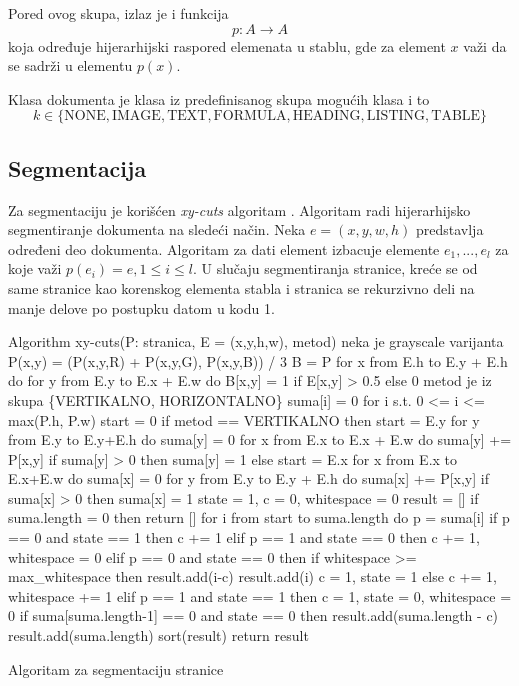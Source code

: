 \documentclass[]{amsart}
\begin{document}
Pored ovog skupa, izlaz je i funkcija $$ p : A \to A $$ koja određuje hijerarhijski raspored elemenata u stablu, gde za element $ x $ važi da se
sadrži u elementu $ p(x) $. 

Klasa dokumenta je klasa iz predefinisanog skupa mogućih klasa i to $$ k \in \{\text{NONE}, \text{IMAGE}, \text{TEXT}, \text{FORMULA}, \text{HEADING}, \text{LISTING}, \text{TABLE}\} $$ 



\subsection{Segmentacija}
\label{sec:org7eee69b}

Za segmentaciju je korišćen \textit{xy-cuts} algoritam \cite{ha1995recursive}. Algoritam radi hijerarhijsko segmentiranje dokumenta na sledeći način. Neka $ e = (x,y,w,h) $ predstavlja određeni
deo dokumenta. Algoritam za dati element izbacuje elemente $ e_1, ..., e_l $ za koje važi $ p(e_i) = e, 1 \le i \le l $. U slučaju segmentiranja stranice, kreće se od same stranice kao korenskog elementa
stabla i stranica se rekurzivno deli na manje delove po postupku datom u kodu 1.


\begin{program}
	\begin{CodeListing}
Algorithm xy-cuts(P: stranica, E = (x,y,h,w), metod)
	neka je grayscale varijanta 
		P(x,y) = (P(x,y,R) + P(x,y,G), P(x,y,B)) / 3 
	B = P
	for x from E.h to E.y + E.h do
		for y from E.y to E.x + E.w do
			B[x,y] = 1 if E[x,y] > 0.5 else 0 
	metod je iz skupa \{VERTIKALNO, HORIZONTALNO\}
	suma[i] = 0 for i s.t. 0 <= i <= max(P.h, P.w)
	start = 0 
	if metod == VERTIKALNO then 
		start = E.y
		for y from E.y to E.y+E.h do
			suma[y] = 0
			for x from E.x to E.x + E.w do
				suma[y] += P[x,y]
			if suma[y] > 0 then suma[y] = 1
	else
		start = E.x
		for x from E.x to E.x+E.w do
			suma[x] = 0
			for y from E.y to E.y + E.h do
				suma[x] += P[x,y]
			if suma[x] > 0 then suma[x] = 1
	state = 1, c = 0, whitespace = 0
	result = []
	if suma.length = 0 then return []
	for i from start to suma.length do
		p = suma[i]
		if p == 0 and state == 1 then c += 1 
		elif p == 1 and state == 0 then 
			c += 1, whitespace = 0
		elif p == 0 and state == 0 then 
			if whitespace >= max_whitespace then 
				result.add(i-c)
				result.add(i)
				c = 1, state = 1 
			else
				c += 1, whitespace += 1
		elif p == 1 and state == 1 then 
			c = 1, state = 0, whitespace = 0
	if suma[suma.length-1] == 0 and state == 0 then 
		result.add(suma.length - c)
		result.add(suma.length)
	sort(result)
	return result 
	\end{CodeListing}
	\caption{Algoritam za segmentaciju stranice}
\end{program}
\end{document}
